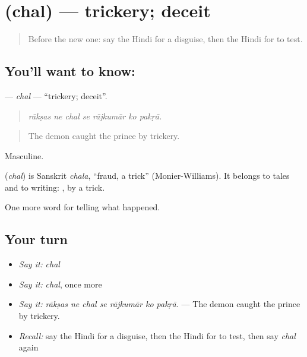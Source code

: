 \section[\texorpdfstring{\hi{छल} (chal)}{छल (chal)}]{ (chal) — trickery; deceit}

\label{lesson:HI-C339-chal}



\begin{quote}
Before the new one: say the Hindi for a disguise, then the Hindi for to test.
\end{quote}

\subsection*{You'll want to know: }
\textbf{} — \emph{chal} — \textquotedblleft{}trickery; deceit\textquotedblright{}.

\begin{quote}
      
\end{quote}

\begin{quote}
\emph{rākṣas ne chal se rājkumār ko pakṛā.}
\end{quote}

\begin{quote}
The demon caught the prince by trickery.
\end{quote}

Masculine.

\begin{cousinweb}
\textbf{} (\emph{chal}) is Sanskrit \emph{chala}, \textquotedblleft{}fraud, a trick\textquotedblright{} (Monier-Williams). It belongs to tales and to writing: \textbf{ }, by a trick.
\end{cousinweb}

\begin{grammarlens}[title={What you've built}]
One more word for telling what happened.
\end{grammarlens}

\subsection*{Your turn}
\begin{itemize}
\raggedright
  \item \emph{Say it:} \emph{chal}
  \item \emph{Say it:} \emph{chal}, once more
  \item \emph{Say it:} \emph{rākṣas ne chal se rājkumār ko pakṛā.} — The demon caught the prince by trickery.
  \item \emph{Recall:} say the Hindi for a disguise, then the Hindi for to test, then say \emph{chal} again
\end{itemize}

